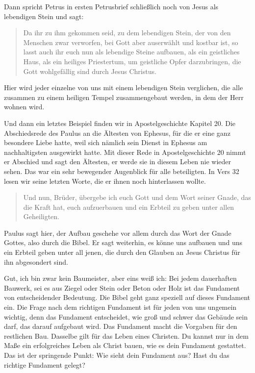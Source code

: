Dann spricht Petrus in ersten Petrusbrief schließlich noch von Jesus als lebendigen Stein und sagt:

\begin{quotation}
  Da ihr zu ihm gekommen seid, zu dem lebendigen Stein, der von den Menschen zwar verworfen, bei Gott aber auserwählt und kostbar ist, so lasst auch ihr euch nun als lebendige Steine aufbauen, als ein geistliches Haus, als ein heiliges Priestertum, um geistliche Opfer darzubringen, die Gott wohlgefällig sind durch Jesus Christus. 
\end{quotation}

Hier wird jeder einzelne von uns mit einem lebendigen Stein verglichen, die alle zusammen zu einem heiligen Tempel zusammengebaut werden, in dem der Herr wohnen wird.

Und dann ein letztes Beispiel finden wir in Apostelgeschichte Kapitel 20. 
Die Abschiedsrede des Paulus an die Ältesten von Ephesus, für die er eine ganz besondere Liebe hatte, weil sich nämlich sein Dienst in Ephesus am nachhaltigsten ausgewirkt hatte. 
Mit dieser Rede in Apostelgeschichte 20 nimmt er Abschied und sagt den Ältesten, er werde sie in diesem Leben nie wieder sehen. 
Das war ein sehr bewegender Augenblick für alle beteiligten. 
In Vers 32 lesen wir seine letzten Worte, die er ihnen noch hinterlassen wollte.

\begin{quotation}
  Und nun, Brüder, übergebe ich euch Gott und dem Wort seiner Gnade, das die Kraft hat, euch aufzuerbauen und ein Erbteil zu geben unter allen Geheiligten.
\end{quotation}

Paulus sagt hier, der Aufbau geschehe vor allem durch das Wort der Gnade Gottes, also durch die Bibel. 
Er sagt weiterhin, es könne uns aufbauen und uns ein Erbteil geben unter all jenen, die durch den Glauben an Jesus Christus für ihn abgesondert sind.

Gut, ich bin zwar kein Baumeister, aber eins weiß ich: Bei jedem dauerhaften Bauwerk, sei es aus Ziegel oder Stein oder Beton oder Holz ist das Fundament von entscheidender Bedeutung. 
Die Bibel geht ganz speziell auf dieses Fundament ein. 
Die Frage nach dem richtigen Fundament ist für jeden von uns ungemein wichtig, denn das Fundament entscheidet, wie groß und schwer das Gebäude sein darf, das darauf aufgebaut wird. Das Fundament macht die Vorgaben für den restlichen Bau. 
Dasselbe gilt für das Leben eines Christen. 
Du kannst nur in dem Maße ein erfolgreiches Leben als Christ bauen, wie es dein Fundament gestattet. 
Das ist der springende Punkt: Wie sieht dein Fundament aus? Hast du das richtige Fundament gelegt?

